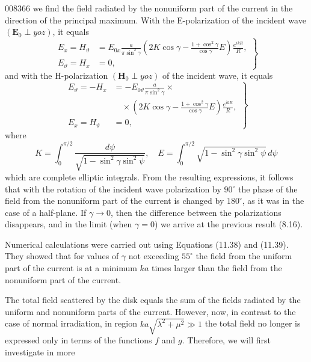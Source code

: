 \begin{scanpage}{0083}{66}
we find the field radiated by the nonuniform part of the current in the direction of the principal maximum. With the E-polarization of the incident wave $(\mathbf E_0\perp yoz)$, it equals
\[
\left.\begin{aligned}
E_x=H_\vartheta&=E_{0x}\frac a{\pi\sin^2\gamma}\left(2K\cos\gamma-\frac{1+\cos^2\gamma}{\cos\gamma}E\right)\frac{e^{ikR}}R,\\
E_\vartheta=H_x&=0,
\end{aligned}\right\}\tag{11.38}
\]
and with the H-polarization $(\mathbf H_0\perp yoz)$ of the incident wave, it equals
\[
\left.\begin{aligned}
E_\vartheta=-H_x&=-E_{0\vartheta}\frac a{\pi\sin^2\gamma}\times\\
&\quad\times\left(2K\cos\gamma-\frac{1+\cos^2\gamma}{\cos\gamma}E\right)\frac{e^{ikR}}R,\\
E_x=H_\vartheta&=0,
\end{aligned}\right\}\tag{11.39}
\]
where
\[K=\int_0^{\pi/2}\frac{d\psi}{\sqrt{1-\sin^2\gamma\sin^2\psi}},\quad E=\int_0^{\pi/2}\sqrt{1-\sin^2\gamma\sin^2\psi}\,d\psi\tag{11.40}\]
which are complete elliptic integrals. From the resulting expressions, it follows that with the rotation of the incident wave polarization by $90^\circ$ the phase of the field from the nonuniform part of the current is changed by $180^\circ$, as it was in the case of a half-plane. If $\gamma\to0$, then the difference between the polarizations disappears, and in the limit (when $\gamma=0$) we arrive at the previous result (8.16).

Numerical calculations were carried out using Equations (11.38) and (11.39). They showed that for values of $\gamma$ not exceeding $55^\circ$ the field from the uniform part of the current is at a minimum $ka$ times larger than the field from the nonuniform part of the current.

The total field scattered by the disk equals the sum of the fields radiated by the uniform and nonuniform parts of the current. However, now, in contrast to the case of normal irradiation, in region $ka\sqrt{\lambda^2+\mu^2}\gg1$ the total field no longer is expressed only in terms of the functions $f$ and $g$. Therefore, we will first investigate in more
\end{scanpage}
